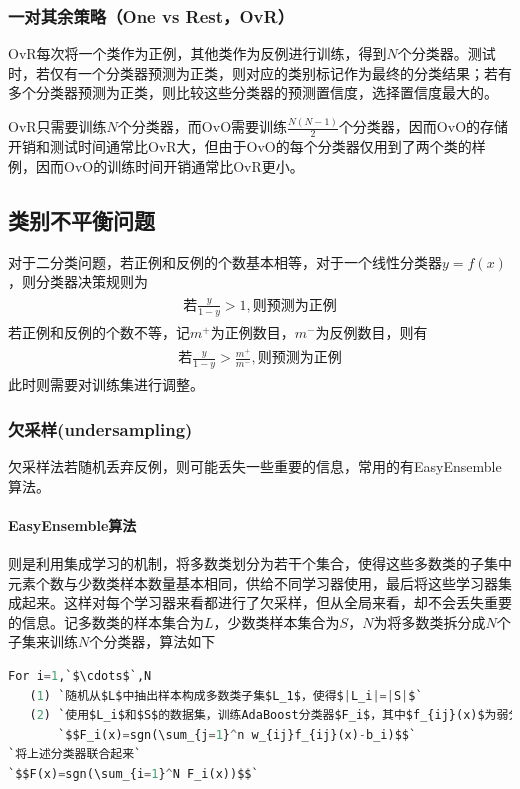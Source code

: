 \subsubsection{一对其余策略（One vs Rest，OvR）}
OvR每次将一个类作为正例，其他类作为反例进行训练，得到$N个$分类器。测试时，若仅有一个分类器预测为正类，则对应的类别标记作为最终的分类结果；若有多个分类器预测为正类，则比较这些分类器的预测置信度，选择置信度最大的。

OvR只需要训练$N$个分类器，而OvO需要训练$\frac{N(N-1)}{2}$个分类器，因而OvO的存储开销和测试时间通常比OvR大，但由于OvO的每个分类器仅用到了两个类的样例，因而OvO的训练时间开销通常比OvR更小。

\subsection{类别不平衡问题}
对于二分类问题，若正例和反例的个数基本相等，对于一个线性分类器$y=f(x)$，则分类器决策规则为
\begin{eqnarray}
\begin{aligned}
\mbox{若}\frac{y}{1-y}>1 , \mbox{则预测为正例}
\end{aligned}
\end{eqnarray}
若正例和反例的个数不等，记$m^+$为正例数目，$m^-$为反例数目，则有
\begin{eqnarray}
\begin{aligned}
\mbox{若}\frac{y}{1-y}>\frac{m^+}{m^-} , \mbox{则预测为正例}
\end{aligned}
\end{eqnarray}
此时则需要对训练集进行调整。
\subsubsection{欠采样(undersampling)}
欠采样法若随机丢弃反例，则可能丢失一些重要的信息，常用的有EasyEnsemble算法。
\paragraph{EasyEnsemble算法}则是利用集成学习的机制，将多数类划分为若干个集合，使得这些多数类的子集中元素个数与少数类样本数量基本相同，供给不同学习器使用，最后将这些学习器集成起来。这样对每个学习器来看都进行了欠采样，但从全局来看，却不会丢失重要的信息。记多数类的样本集合为$L$，少数类样本集合为$S$，$N$为将多数类拆分成$N$个子集来训练$N$个分类器，算法如下
\begin{lstlisting}[language=python]
For i=1,`$\cdots$`,N
   (1) `随机从$L$中抽出样本构成多数类子集$L_1$，使得$|L_i|=|S|$`
   (2) `使用$L_i$和$S$的数据集，训练AdaBoost分类器$F_i$，其中$f_{ij}(x)$为弱分类器`
       `$$F_i(x)=sgn(\sum_{j=1}^n w_{ij}f_{ij}(x)-b_i)$$`
`将上述分类器联合起来`
`$$F(x)=sgn(\sum_{i=1}^N F_i(x))$$`
\end{lstlisting}

